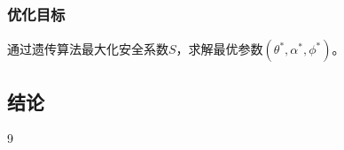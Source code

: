 \documentclass{cumcmthesis}
\begin{document}
\subsubsection{优化目标}
通过遗传算法最大化安全系数$S$，求解最优参数$(\theta^*, \alpha^*, \phi^*)$。

\subsection{结论}





\begin{thebibliography}{9}%
   
\end{thebibliography}

\newpage
\begin{appendices}


\end{appendices}
\end{document}
